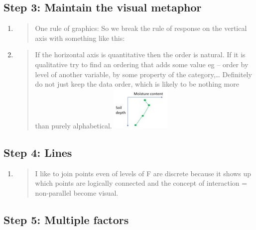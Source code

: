\documentclass[
]{book}
\begin{document}
\hypertarget{step-3-maintain-the-visual-metaphor}{%
\subsection{Step 3: Maintain the visual metaphor}\label{step-3-maintain-the-visual-metaphor}}

\begin{enumerate}
\def\labelenumi{\alph{enumi}.}
\item
  \begin{quote}
  One rule of graphics: So we break the rule of response on the vertical axis with something like this:
  \end{quote}
\item
  \begin{quote}
  If the horizontal axis is quantitative then the order is natural. If it is qualitative try to find an ordering that adds some value eg -- order by level of another variable, by some property of the category,\ldots{} Definitely do not just keep the data order, which is likely to be nothing more than purely alphabetical.
  \includegraphics{img/Picture6.jpg}
  \end{quote}
\end{enumerate}

\hypertarget{step-4-lines}{%
\subsection{Step 4: Lines}\label{step-4-lines}}

\begin{enumerate}
\def\labelenumi{\alph{enumi}.}
\item
  \begin{quote}
  I like to join points even of levels of F are discrete because it shows up which points are logically connected and the concept of interaction = non-parallel become visual.
  \end{quote}
\end{enumerate}

\hypertarget{step-5-multiple-factors}{%
\subsection{Step 5: Multiple factors}\label{step-5-multiple-factors}}
\end{document}
